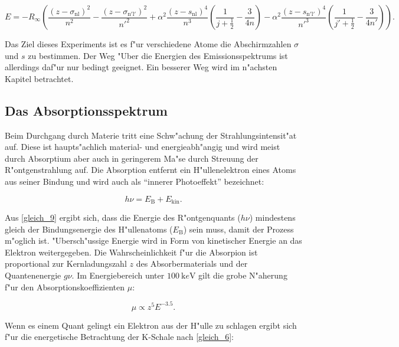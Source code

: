 		\begin{equation}
			E = -R_\infty \left( \frac{(z - \sigma_\mathrm{nl})^2}{n^2} - \frac{(z - \sigma_\mathrm{n'l'})^2}{n'^2} +  \alpha^2 \frac{(z - s_\mathrm{nl})^4}{n^3} \left( \frac{1}{j + \frac{1}{2}} - \frac{3}{4n} \right) - \alpha^2 \frac{(z - s_\mathrm{n'l'})^4}{n'^3} \left( \frac{1}{j' + \frac{1}{2}} - \frac{3}{4n'} \right) \right) . \label{gleich_8}
		\end{equation}

		Das Ziel dieses Experiments ist es f"ur verschiedene Atome die Abschirmzahlen $\sigma$ und $s$ zu bestimmen.
		Der Weg "Uber die Energien des Emissionsspektrums ist allerdings daf"ur nur bedingt geeignet.
		Ein besserer Weg wird im n"achsten Kapitel betrachtet.

	\subsection{Das Absorptionsspektrum}
	\label{sub:das_absorptionsspektrum}
	
		Beim Durchgang durch Materie tritt eine Schw"achung der Strahlungsintensit"at auf.
		Diese ist haupts"achlich material- und energieabh"angig und wird meist durch Absorptium aber auch in geringerem Ma"se durch Streuung der R"ontgenstrahlung auf. 
		Die Absorption entfernt ein H"ullenelektron eines Atoms aus seiner Bindung und wird auch als "`innerer Photoeffekt"' bezeichnet:

		\begin{equation}
			h\nu = E_\mathrm{B} + E_\mathrm{kin}. \label{gleich_9}
		\end{equation}

		Aus \eqref{gleich_9} ergibt sich, dass die Energie des R"ontgenquants ($h\nu$) mindestens gleich der Bin\-dungs\-en\-er\-gie des H"ullenatoms ($E_\mathrm{B}$) sein muss, damit der Prozess m"oglich ist.
		"Ubersch"ussige Energie wird in Form von kinetischer Energie an das Elektron weitergegeben.
		Die Wahr\-schein\-lich\-keit f"ur die Absorpion ist proportional zur Kernladungszahl $z$ des Absorbermaterials und der Quantenenergie $g\nu$.
		Im Energiebereich unter $\SI{100}{\kilo e \volt}$ gilt die grobe N"aherung f"ur den Absorptionskoeffizienten $\mu$:
		
		\begin{equation}
			\mu \propto z^5 E^{-3.5}. \label{gleich_10}
		\end{equation}

		Wenn es einem Quant gelingt ein Elektron aus der H"ulle zu schlagen ergibt sich f"ur die energetische Betrachtung der K-Schale nach \eqref{gleich_6}:

